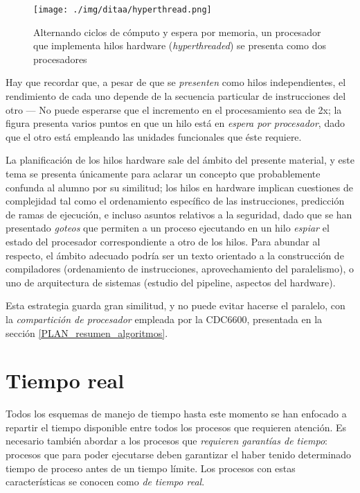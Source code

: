 \documentclass[11pt,fleqn]{book} %
\begin{document}
\begin{figure}[htb]
\centering
\texttt{[image: ./img/ditaa/hyperthread.png]}
\caption{\label{PLAN_hyperthread}Alternando ciclos de cómputo y espera por memoria, un procesador que implementa hilos hardware (\emph{hyperthreaded}) se presenta como dos procesadores}
\end{figure}

Hay que recordar que, a pesar de que se \emph{presenten} como hilos
independientes, el rendimiento de cada uno depende de la secuencia
particular de instrucciones del otro — No puede esperarse que el
incremento en el procesamiento sea de 2x; la figura presenta
varios puntos en que un hilo está en \emph{espera por procesador}, dado que
el otro está empleando las unidades funcionales que éste requiere.

La planificación de los hilos hardware sale del ámbito del presente
material, y este tema se presenta únicamente para aclarar un concepto que
probablemente confunda al alumno por su similitud; los hilos en
hardware implican cuestiones de complejidad tal como el ordenamiento
específico de las instrucciones, predicción de ramas de ejecución, e
incluso asuntos relativos a la seguridad, dado que se han presentado
\emph{goteos} que permiten a un proceso ejecutando en un hilo \emph{espiar} el
estado del procesador correspondiente a otro de los hilos. Para
abundar al respecto, el ámbito adecuado podría ser un texto orientado
a la construcción de compiladores (ordenamiento de instrucciones,
aprovechamiento del paralelismo), o uno de arquitectura de sistemas
(estudio del pipeline, aspectos del hardware).

Esta estrategia guarda gran similitud, y no puede evitar hacerse el
paralelo, con la \emph{compartición de procesador} empleada por la CDC6600,
presentada en la sección \ref{PLAN_resumen_algoritmos}.
\section{Tiempo real}
\label{sec-4-5}


Todos los esquemas de manejo de tiempo hasta este momento se han
enfocado a repartir el tiempo disponible entre todos los procesos que
requieren atención. Es necesario también abordar a los procesos que
\emph{requieren garantías de tiempo}: procesos que para poder
ejecutarse deben garantizar el haber tenido determinado tiempo de
proceso antes de un tiempo límite. Los procesos con estas
características se conocen como \emph{de tiempo real}.
\end{document}

